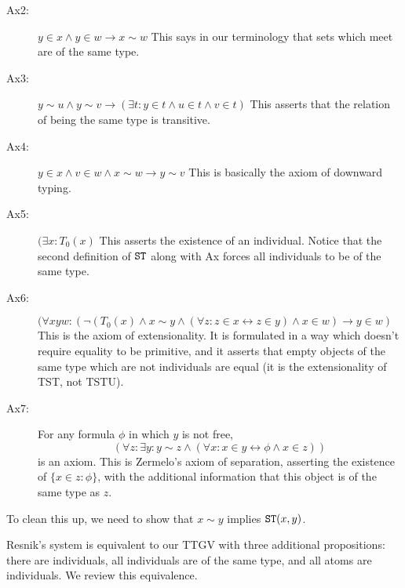 \documentclass{slides}
\begin{document}
\begin{slide}
\begin{description}
\item[Ax2:]  $y \in x \wedge y \in w \rightarrow x \sim w$  This says in our terminology that sets which meet are of the same type.

\item[Ax3:]  $y \sim u \wedge y \sim v \rightarrow (\exists t:y  \in t \wedge u \in t \wedge v \in t)$  This asserts that the relation of being the same type is transitive. 

\item[Ax4:]  $y \in x \wedge v \in w \wedge x \sim w \rightarrow y \sim v$  This is basically the axiom of downward typing.

\item[Ax5:]  $(\exists x:T_0(x)$  This asserts the existence of an individual.  Notice that the second definition of ${\tt ST}$ along with Ax forces all individuals to be of the same type.

\item[Ax6:]  $(\forall xyw:  (\neg(T_0(x) \wedge x \sim y \wedge (\forall z:z \in x \leftrightarrow z \in y) \wedge x \in w) \rightarrow y \in w)$  This is the axiom of extensionality.  It is formulated in a way which doesn't require equality to be primitive, and it asserts that
empty objects of the same type which are not individuals are equal (it is the extensionality of TST, not TSTU).

\item[Ax7:]  For any formula $\phi$ in which $y$ is not free, $$(\forall z: \exists y:y \sim z \wedge (\forall x:x \in y \leftrightarrow \phi \wedge x \in z))$$ is an axiom. This is Zermelo's axiom of separation, asserting the existence of \newline $\{x \in z:\phi\}$, with the additional information that this object is of the same type as $z$.

\end{description}

\end{slide}

\begin{slide}

To clean this up, we need to show that $x \sim y$ implies ${\tt ST}(x,y)$.


\end{slide}

\begin{slide}

Resnik's system is equivalent to our TTGV with three additional propositions:  there are individuals, all individuals are of the same type, and all atoms are individuals.  We review this equivalence.

\end{slide}
\end{document}
